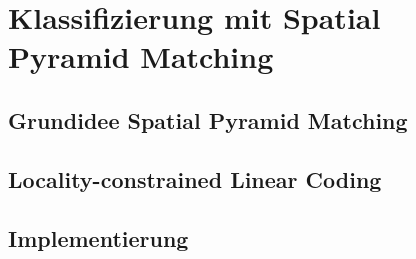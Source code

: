 \newpage
\section{Klassifizierung mit Spatial Pyramid Matching}

\subsection{Grundidee Spatial Pyramid Matching}

\subsection{Locality-constrained Linear Coding}

\subsection{Implementierung}